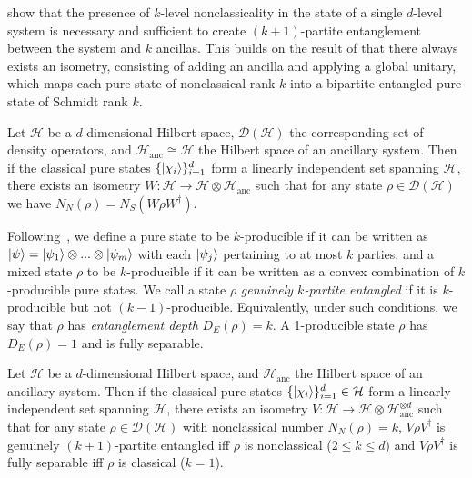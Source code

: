 \documentclass[a4paper]{report}
\newcommand{\on}[1]{\operatorname{#1}}
\newcommand{\calH}{{\mathcal{H}}}
\begin{document}
\cite{regula2017converting} show that the presence of $k$-level nonclassicality in the state of a single $d$-level system is necessary and sufficient to create $(k+1)$-partite entanglement between the system and $k$ ancillas.
This builds on the result of \cite{killoran2016converting} that there always exists an isometry, consisting of adding an ancilla and applying a global unitary, which maps each pure state of nonclassical rank $k$ into a bipartite entangled pure state of Schmidt rank $k$.

\begin{thm}
	\renewcommand{\DH}{\mathcal D(\calH{})}
	\newcommand{\calHanc}{\calH_{\on{anc}}}
	Let $\calH$ be a $d$-dimensional Hilbert space, $\DH{}$ the corresponding set of density operators,
	and $\calHanc{} \cong \calH{}$ the Hilbert space of an ancillary system.
	Then if the classical pure states $\{ \ket{\chi_i} \}_{i=1}^d$ form a linearly independent set spanning $\calH{}$,
	there exists an isometry $W: \calH{} \to \calH{} \otimes \calHanc{}$ such that for any state $\rho \in \DH{}$ we have
	$N_N(\rho) = N_S(W \rho W^\dagger)$.
\end{thm}
 
Following~\cite{ghne2005multipartite}, we define a pure state to be $k$-producible if it can be written as
$\ket\psi = \ket{\psi_1} \otimes ... \otimes \ket{\psi_m}$ with each $\ket{\psi_j}$ pertaining to at most $k$ parties,
and a mixed state $\rho$ to be $k$-producible if it can be written as a convex combination of $k$-producible pure states.
We call a state $\rho$ \emph{genuinely $k$-partite entangled} if it is $k$-producible but not $(k-1)$-producible.
Equivalently, under such conditions, we say that $\rho$ has \emph{entanglement depth} $D_E(\rho) = k$.
A 1-producible state $\rho$ has $D_E(\rho)=1$ and is fully separable.

\begin{thm}
	\renewcommand{\DH}{\mathcal D(\calH{})}
	\newcommand{\aHanc}{\mathcal H_{\on{anc}}}
	Let $\calH$ be a $d$-dimensional Hilbert space, and $\aHanc$ the Hilbert space of an ancillary system.
	Then if the classical pure states $\{ \ket{\chi_i} \}_{i=1}^d \in \calH$ form a linearly independent set spanning $\calH$, there exists an isometry $V: \calH\to\calH\otimes\aHanc^{\otimes d}$
	such that for any state $\rho\in\DH$ with nonclassical number $N_N(\rho)=k$,
	$V \rho V^\dagger$ is genuinely $(k+1)$-partite entangled iff $\rho$ is nonclassical ($2\le k\le d$)
	and $V\rho V^\dagger$ is fully separable iff $\rho$ is classical ($k=1$).
\end{thm}
\end{document}
